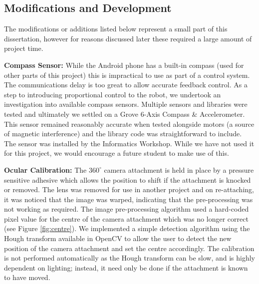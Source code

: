 \documentclass[a4paper,11pt,twoside,openright]{article}
\begin{document}
\subsection{ Modifications and Development }\label{sec:mod}
The modifications or additions listed below represent a small part of
this dissertation, however for reasons discussed later these required
a large amount of project time.

\textbf{Compass Sensor:}
While the Android phone has a built-in compass (used for other parts of this
project) this is impractical to use as part of a control system. The
communications delay is too great to allow accurate feedback control.
As a step to introducing proportional control to the robot, we undertook an
investigation into available compass sensors. Multiple sensors and libraries
were tested and ultimately we settled on a Grove 6-Axis Compass \& Accelerometer.
This sensor remained reasonably accurate when tested alongside motors (a
source of magnetic interference) and the library code was straightforward to
include. The sensor was installed by the Informatics Workshop. While we have not
used it for this project, we would encourage a future student to make use of
this.
\newline
\par

\textbf{Ocular Calibration:}
The $360^{\circ}$ camera attachment is held in place by a pressure sensitive
adhesive which allows the position to shift if the attachment is knocked or
removed. The lens was removed for use in another project and on re-attaching, it
was noticed that the image was warped, indicating that the pre-processing was not
working as required. The image pre-processing algorithm used a hard-coded pixel
value for the centre of the camera attachment which was no longer correct
(see Figure \ref{fig:centre}). We implemented a simple detection
algorithm using the Hough transform available in OpenCV to allow the user
to detect the new position of the camera attachment and set the centre
accordingly. The calibration is not performed automatically as the Hough
transform can be slow, and is highly dependent on lighting; instead, it
need only be done if the attachment is known to have moved.
\newline
\par
\end{document}
